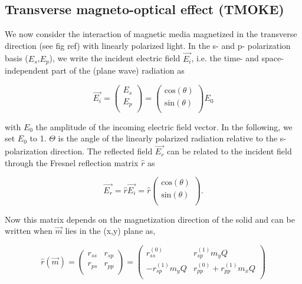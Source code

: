 \subsection{Transverse magneto-optical effect (TMOKE)}
 
We now consider the interaction of magnetic media magnetized in the transverse direction (see fig ref) with linearly polarized light. In the s- and p- polarization basis ($E_s$,$E_p$), we write the incident electric field $\vec{E_i}$, i.e. the time- and space- independent part of the (plane wave) radiation as

\begin{equation}
\overrightarrow{E_i} = \left({\begin{array}{c}
	E_s \\
	E_p \\
	\end{array} } \right) 
= \left({\begin{array}{c}
	\text{cos}(\theta) \\
	\text{sin}(\theta) \\
	\end{array} } \right) E_0
\end{equation}

with $E_0$ the amplitude of the incoming electric field vector. In the following, we set $E_0$ to 1. $\Theta$ is the angle of the linearly polarized radiation relative to the s-polarization direction. The reflected field $\overrightarrow{E_r}$ can be related to the incident field through the Fresnel reflection matrix $\hat{r}$ as

\begin{equation}
\overrightarrow{E_r} = \hat{r}\overrightarrow{E_i}=\hat{r}\left({\begin{array}{c}
	\text{cos}(\theta) \\
	\text{sin}(\theta) \\
	\end{array} } \right) .
\end{equation}

Now this matrix depends on the magnetization direction of the solid and can be written when $\vec{m}$ lies in the (x,y) plane as,

\begin{equation}
\hat{r}(\vec{m})= \left({\begin{array}{cc}
	r_{ss} & r_{sp} \\
	r_{ps} & r_{pp} \\ 
	\end{array} } \right) 
= \left({\begin{array}{cc}
	r_{ss}^{(0)} & r_{sp}^{(1)}m_y Q \\
	-r_{sp}^{(1)} m_y Q & r_{pp}^{(0)}+r_{pp}^{(1)}m_x Q \\ 
	\end{array} } \right)
\end{equation}

